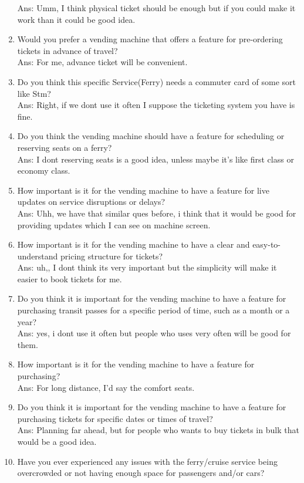 \begin{enumerate}
Ans: Umm, I think physical ticket should be enough but if you could make it work than it could be good idea.
    \item Would you prefer a vending machine that offers a feature for pre-ordering tickets in advance of travel?\\
Ans: For me, advance ticket will be convenient.
    \item Do you think this specific Service(Ferry) needs a commuter card of some sort like Stm?\\
Ans: Right, if we dont use it often I suppose the ticketing system you have is fine.
    \item Do you think the vending machine should have a feature for scheduling or reserving seats on a ferry?\\
Ans: I dont reserving seats is a good idea, unless maybe it's like first class or economy class.
    \item How important is it for the vending machine to have a feature for live updates on service disruptions or delays?\\
Ans: Uhh, we have that similar ques before, i think that it would be good for providing updates which I can see on machine screen.
    \item How important is it for the vending machine to have a clear and easy-to-understand pricing structure for tickets?\\
Ans: uh,, I dont think its very important but the simplicity will make it easier to book tickets for me.
    \item Do you think it is important for the vending machine to have a feature for purchasing transit passes for a specific period of time, such as a month or a year?\\
Ans: yes, i dont use it often but people who uses very often will be good for them.
    \item How important is it for the vending machine to have a feature for purchasing?\\
Ans: For long distance, I’d say the comfort seats.
    \item Do you think it is important for the vending machine to have a feature for purchasing tickets for specific dates or times of travel?\\
Ans: Planning far ahead, but for people who wants to buy tickets in bulk that would be a good idea.
    \item Have you ever experienced any issues with the ferry/cruise service being overcrowded or not having enough space for passengers and/or cars?\\

\end{enumerate}
